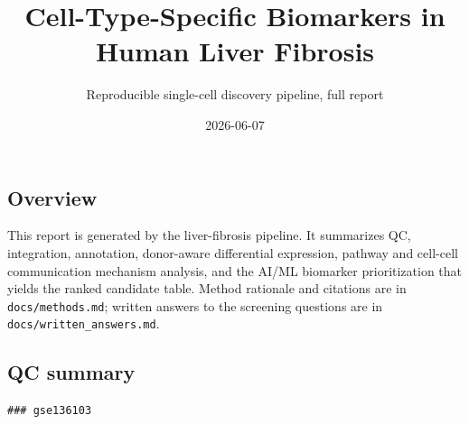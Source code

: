 \documentclass[
  letterpaper,
  DIV=11,
  numbers=noendperiod]{scrartcl}
\title{Cell-Type-Specific Biomarkers in Human Liver Fibrosis}
\subtitle{Reproducible single-cell discovery pipeline, full report}
\author{}
\date{2026-06-07}
\begin{document}
\maketitle


\subsection{Overview}\label{overview}

This report is generated by the liver-fibrosis pipeline. It summarizes
QC, integration, annotation, donor-aware differential expression,
pathway and cell-cell communication mechanism analysis, and the AI/ML
biomarker prioritization that yields the ranked candidate table. Method
rationale and citations are in \texttt{docs/methods.md}; written answers
to the screening questions are in \texttt{docs/written\_answers.md}.

\subsection{QC summary}\label{qc-summary}

\begin{verbatim}
### gse136103
\end{verbatim}
\end{document}
